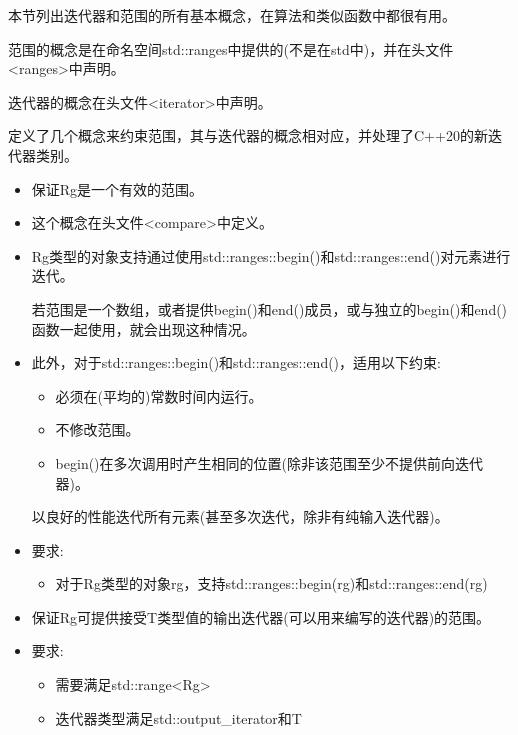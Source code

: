 
本节列出迭代器和范围的所有基本概念，在算法和类似函数中都很有用。

范围的概念是在命名空间std::ranges中提供的(不是在std中)，并在头文件<ranges>中声明。

迭代器的概念在头文件<iterator>中声明。


定义了几个概念来约束范围，其与迭代器的概念相对应，并处理了C++20的新迭代器类别。


\begin{itemize}
\item
保证Rg是一个有效的范围。

\item
这个概念在头文件<compare>中定义。

\item
Rg类型的对象支持通过使用std::ranges::begin()和std::ranges::end()对元素进行迭代。

若范围是一个数组，或者提供begin()和end()成员，或与独立的begin()和end()函数一起使用，就会出现这种情况。

\item
此外，对于std::ranges::begin()和std::ranges::end()，适用以下约束:

\begin{itemize}
\item
必须在(平均的)常数时间内运行。

\item
不修改范围。

\item
begin()在多次调用时产生相同的位置(除非该范围至少不提供前向迭代器)。
\end{itemize}

以良好的性能迭代所有元素(甚至多次迭代，除非有纯输入迭代器)。

\item
要求:

\begin{itemize}
\item
对于Rg类型的对象rg，支持std::ranges::begin(rg)和std::ranges::end(rg)
\end{itemize}
\end{itemize}


\begin{itemize}
\item
保证Rg可提供接受T类型值的输出迭代器(可以用来编写的迭代器)的范围。

\item
要求:

\begin{itemize}
\item
需要满足std::range<Rg>

\item
迭代器类型满足std::output\_iterator和T
\end{itemize}
\end{itemize}


